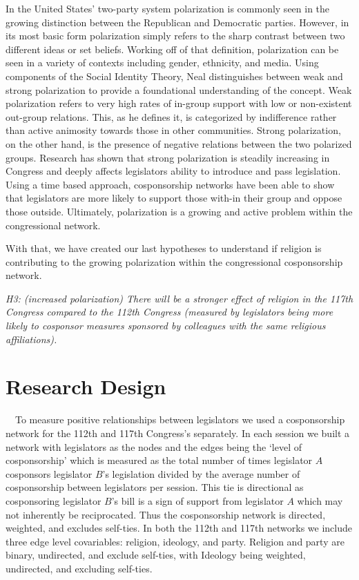 \documentclass[Royal,times,sageh]{sagej}
\begin{document}
In the United States' two-party system polarization is commonly seen in
the growing distinction between the Republican and Democratic parties.
However, in its most basic form polarization simply refers to the sharp
contrast between two different ideas or set beliefs. Working off of that
definition, polarization can be seen in a variety of contexts including
gender, ethnicity, and media. Using components of the Social Identity
Theory, Neal \citeyearpar{neal2020} distinguishes between weak and
strong polarization to provide a foundational understanding of the
concept. Weak polarization refers to very high rates of in-group support
with low or non-existent out-group relations. This, as he defines it, is
categorized by indifference rather than active animosity towards those
in other communities. Strong polarization, on the other hand, is the
presence of negative relations between the two polarized groups.
Research has shown that strong polarization is steadily increasing in
Congress and deeply affects legislators ability to introduce and pass
legislation. Using a time based approach, cosponsorship networks have
been able to show that legislators are more likely to support those
with-in their group and oppose those outside. Ultimately, polarization
is a growing and active problem within the congressional network.

With that, we have created our last hypotheses to understand if religion
is contributing to the growing polarization within the congressional
cosponsorship network.

\emph{H3: (increased polarization) There will be a stronger effect of
religion in the 117th Congress compared to the 112th Congress (measured
by legislators being more likely to cosponsor measures sponsored by
colleagues with the same religious affiliations).}

\hypertarget{research-design}{%
\section{Research Design}\label{research-design}}

~~To measure positive relationships between legislators we used a
cosponsorship network for the 112th and 117th Congress's separately. In
each session we built a network with legislators as the nodes and the
edges being the `level of cosponsorship' which is measured as the total
number of times legislator \(A\) cosponsors legislator \(B\)'s
legislation divided by the average number of cosponsorship between
legislators per session. This tie is directional as cosponsoring
legislator \(B\)'s bill is a sign of support from legislator \(A\) which
may not inherently be reciprocated. Thus the cosponsorship network is
directed, weighted, and excludes self-ties. In both the 112th and 117th
networks we include three edge level covariables: religion, ideology,
and party. Religion and party are binary, undirected, and exclude
self-ties, with Ideology being weighted, undirected, and excluding
self-ties.
\end{document}
